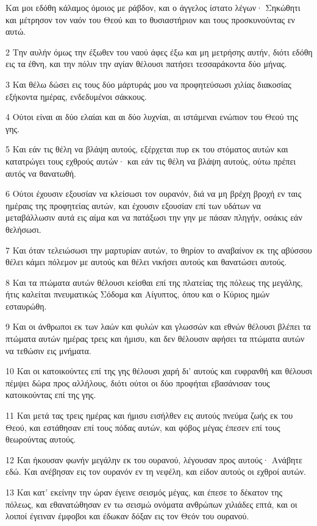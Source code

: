 \par Και μοι εδόθη κάλαμος όμοιος με ράβδον, και ο άγγελος ίστατο λέγων· Σηκώθητι και μέτρησον τον ναόν του Θεού και το θυσιαστήριον και τους προσκυνούντας εν αυτώ.
\par 2 Την αυλήν όμως την έξωθεν του ναού άφες έξω και μη μετρήσης αυτήν, διότι εδόθη εις τα έθνη, και την πόλιν την αγίαν θέλουσι πατήσει τεσσαράκοντα δύο μήνας.
\par 3 Και θέλω δώσει εις τους δύο μάρτυράς μου να προφητεύσωσι χιλίας διακοσίας εξήκοντα ημέρας, ενδεδυμένοι σάκκους.
\par 4 Ούτοι είναι αι δύο ελαίαι και αι δύο λυχνίαι, αι ιστάμεναι ενώπιον του Θεού της γης.
\par 5 Και εάν τις θέλη να βλάψη αυτούς, εξέρχεται πυρ εκ του στόματος αυτών και κατατρώγει τους εχθρούς αυτών· και εάν τις θέλη να βλάψη αυτούς, ούτω πρέπει αυτός να θανατωθή.
\par 6 Ούτοι έχουσιν εξουσίαν να κλείσωσι τον ουρανόν, διά να μη βρέχη βροχή εν ταις ημέραις της προφητείας αυτών, και έχουσιν εξουσίαν επί των υδάτων να μεταβάλλωσιν αυτά εις αίμα και να πατάξωσι την γην με πάσαν πληγήν, οσάκις εάν θελήσωσι.
\par 7 Και όταν τελειώσωσι την μαρτυρίαν αυτών, το θηρίον το αναβαίνον εκ της αβύσσου θέλει κάμει πόλεμον με αυτούς και θέλει νικήσει αυτούς και θανατώσει αυτούς.
\par 8 Και τα πτώματα αυτών θέλουσι κείσθαι επί της πλατείας της πόλεως της μεγάλης, ήτις καλείται πνευματικώς Σόδομα και Αίγυπτος, όπου και ο Κύριος ημών εσταυρώθη.
\par 9 Και οι άνθρωποι εκ των λαών και φυλών και γλωσσών και εθνών θέλουσι βλέπει τα πτώματα αυτών ημέρας τρεις και ήμισυ, και δεν θέλουσιν αφήσει τα πτώματα αυτών να τεθώσιν εις μνήματα.
\par 10 Και οι κατοικούντες επί της γης θέλουσι χαρή δι' αυτούς και ευφρανθή και θέλουσι πέμψει δώρα προς αλλήλους, διότι ούτοι οι δύο προφήται εβασάνισαν τους κατοικούντας επί της γης.
\par 11 Και μετά τας τρεις ημέρας και ήμισυ εισήλθεν εις αυτούς πνεύμα ζωής εκ του Θεού, και εστάθησαν επί τους πόδας αυτών, και φόβος μέγας έπεσεν επί τους θεωρούντας αυτούς.
\par 12 Και ήκουσαν φωνήν μεγάλην εκ του ουρανού, λέγουσαν προς αυτούς· Ανάβητε εδώ. Και ανέβησαν εις τον ουρανόν εν τη νεφέλη, και είδον αυτούς οι εχθροί αυτών.
\par 13 Και κατ' εκείνην την ώραν έγεινε σεισμός μέγας, και έπεσε το δέκατον της πόλεως, και εθανατώθησαν εν τω σεισμώ ονόματα ανθρώπων χιλιάδες επτά, και οι λοιποί έγειναν έμφοβοι και έδωκαν δόξαν εις τον Θεόν του ουρανού.
